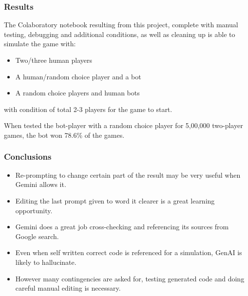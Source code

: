 \documentclass[runningheads]{llncs}
\begin{document}
\subsubsection{Results}
The Colaboratory notebook resulting from this project\cite{ref_colab_link}, complete with manual testing, debugging and additional conditions, as well as cleaning up is able to simulate the game with:
\begin{itemize}
    \item Two/three human players
    \item A human/random choice player and a bot
    \item A random choice players and human bots
\end{itemize}
with condition of total 2-3 players for the game to start.

When tested the bot-player with a random choice player for 5,00,000 two-player games, the bot won 78.6\% of the games.

\subsubsection{Conclusions}
\begin{itemize}
    \item Re-prompting to change certain part of the result may be very useful when Gemini allows it.
    \item Editing the last prompt given to word it clearer is a great learning opportunity.
    \item Gemini does a great job cross-checking and referencing its sources from Google search.
    \item Even when self written correct code is referenced for a simulation, GenAI is likely to hallucinate.
    \item However many contingencies are asked for, testing generated code and doing careful manual editing is necessary.
\end{itemize}


% 
\end{document}
